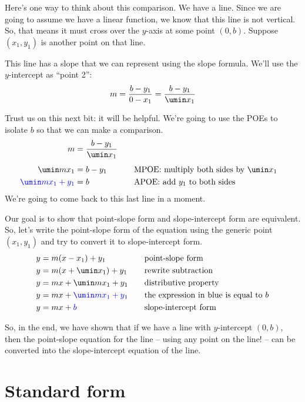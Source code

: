 Here's one way to think about this comparison. We have a line. Since we are going to assume we have a linear function, we know that this line is not vertical. So, that means it must cross over the $y$-axis at some point $(0,b)$. Suppose $(x_1, y_1)$ is another point on that line. 

This line has a slope that we can represent using the slope formula. We'll use the $y$-intercept as ``point 2'': \[m = \frac{b-y_1}{0-x_1} = \frac{b-y_1}{\umin x_1}\]

Trust us on this next bit: it will be helpful. We're going to use the POEs to isolate $b$ so that we can make a comparison.
\[\begin{aligned}
m &= \frac{b-y_1}{\umin x_1}\\[1ex]
\umin mx_1 &= b-y_1
&&\quad\text{MPOE: multiply both sides by $\umin x_1$}\\
{\color{blue}\umin mx_1 + y_1} &= b
&&\quad\text{APOE: add $y_1$ to both sides}\\
\end{aligned}\]
We're going to come back to this last line in a moment.

Our goal is to show that point-slope form and slope-intercept form are equivalent. So, let's write the point-slope form of the equation using the generic point $(x_1,y_1)$ and try to convert it to slope-intercept form.
\[\begin{aligned}
y &= m(x-x_1) + y_1
&&\quad\text{point-slope form}\\
y &= m(x+ \umin x_1) + y_1
&&\quad\text{rewrite subtraction}\\
y &= mx + \umin mx_1 + y_1
&&\quad\text{distributive property}\\
y &= mx + {\color{blue} \umin mx_1 + y_1}
&&\quad\text{the expression in blue is equal to $b$}\\
y &= mx + {\color{blue} b}
&&\quad\text{slope-intercept form}
\end{aligned}\]

So, in the end, we have shown that if we have a line with $y$-intercept $(0,b)$, then the point-slope equation for the line -- using any point on the line! -- can be converted into the slope-intercept equation of the line.

\section{Standard form}
\label{sec:standardform}

